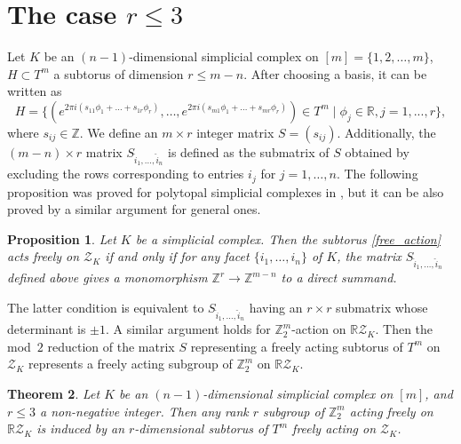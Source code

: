 \documentclass[11pt]{amsart}
\theoremstyle{plain}
\newtheorem{theorem}{Theorem}[section]
\newtheorem{proposition}[theorem]{Proposition}
\numberwithin{equation}{section}
\theoremstyle{definition}
\newcommand{\R}{\mathbb{R}}
\newcommand{\Z}{\mathbb{Z}}
\newcommand{\cZ}{\mathcal{Z}}
\begin{document}
\section{The case $r \leq 3$} \label{sec:m-l<=3}
Let $K$ be an $(n-1)$-dimensional simplicial complex on $[m]=\{1, 2, \ldots, m\}$, $H \subset T^m$ a subtorus of dimension $r \leq m-n$.
After choosing a basis, it can be written as
\begin{equation}\label{free_action}
    H = \{(e^{2 \pi i (s_{11} \phi_1 + \dots + s_{1r} \phi_r)}, \ldots, e^{2 \pi i (s_{m1} \phi_1 + \dots + s_{mr} \phi_r)}) \in T^m \mid \phi_j \in \R, j=1, ..., r\},
\end{equation}
where $s_{ij} \in \Z$.
We define an $m \times r$ integer matrix $S=(s_{ij})$.
Additionally, the $(m-n) \times r$ matrix $S_{\hat{i}_1, \ldots, \hat{i}_n}$ is defined as the submatrix of $S$ obtained by excluding the rows corresponding to entries $i_j$ for $j=1, \ldots,n$.
The following proposition was proved for polytopal simplicial complexes in \cite{BP2002}, but it can be also proved by a similar argument for general ones.

\begin{proposition} \label{proposition:free action}
    Let $K$ be a simplicial complex. Then the subtorus \eqref{free_action} acts freely on $\cZ_K$ if and only if for any facet $\{i_1, \ldots, i_n\}$ of $K$, the matrix $S_{\hat{i}_1, \ldots, \hat{i}_n}$ defined above gives a monomorphism $\Z^r \longrightarrow \Z^{m-n}$ to a direct summand.
\end{proposition}

The latter condition is equivalent to $S_{\hat{i}_1, \ldots, \hat{i}_n}$ having an $r \times r$ submatrix whose determinant is $\pm 1$.
A similar argument holds for $\Z_2^m$-action on $\R\cZ_K$.
Then the mod~$2$ reduction of the matrix $S$ representing a freely acting subtorus of $T^m$ on $\cZ_K$ represents a freely acting subgroup of $\Z_2^m$ on $\R \cZ_K$.

\begin{theorem} \label{thm: r3}
    Let $K$ be an $(n-1)$-dimensional simplicial complex on $[m]$, and $r \leq 3$ a non-negative integer.
    Then any rank $r$ subgroup of $\Z_2^m$ acting freely on $\R\mathcal{Z}_K$ is induced by an $r$-dimensional subtorus of $T^m$ freely acting on $\cZ_K$.
\end{theorem}
\end{document}
